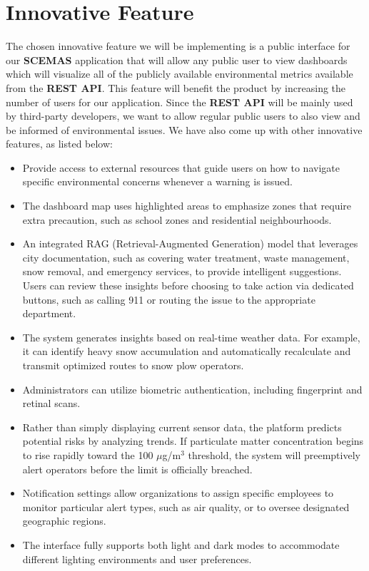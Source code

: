 \documentclass[]{article}
\begin{document}


\section{Innovative Feature}
\label{sec:innovative_feature}
The chosen innovative feature we will be implementing is a public interface for our \textbf{SCEMAS} application that will allow any public user to view dashboards which will visualize all of the publicly available environmental metrics available from the \textbf{REST API}. This feature will benefit the product by increasing the number of users for our application. Since the \textbf{REST API} will be mainly used by third-party developers, we want to allow regular public users to also view and be informed of environmental issues. We have also come up with other innovative features, as listed below:

\begin{itemize}
	\item Provide access to external resources that guide users on how to navigate specific environmental concerns whenever a warning is issued.
	\item The dashboard map uses highlighted areas to emphasize zones that require extra precaution, such as school zones and residential neighbourhoods.
	\item An integrated RAG (Retrieval-Augmented Generation) model that leverages city documentation, such as covering water treatment, waste management, snow removal, and emergency services, to provide intelligent suggestions. Users can review these insights before choosing to take action via dedicated buttons, such as calling 911 or routing the issue to the appropriate department.
	\item The system generates insights based on real-time weather data. For example, it can identify heavy snow accumulation and automatically recalculate and transmit optimized routes to snow plow operators.
	\item Administrators can utilize biometric authentication, including fingerprint and retinal scans.
	\item Rather than simply displaying current sensor data, the platform predicts potential risks by analyzing trends. If particulate matter concentration begins to rise rapidly toward the 100 $\mu$g/m$^3$ threshold, the system will preemptively alert operators before the limit is officially breached.
	\item Notification settings allow organizations to assign specific employees to monitor particular alert types, such as air quality, or to oversee designated geographic regions.
	\item The interface fully supports both light and dark modes to accommodate different lighting environments and user preferences.
\end{itemize}
\end{document}
